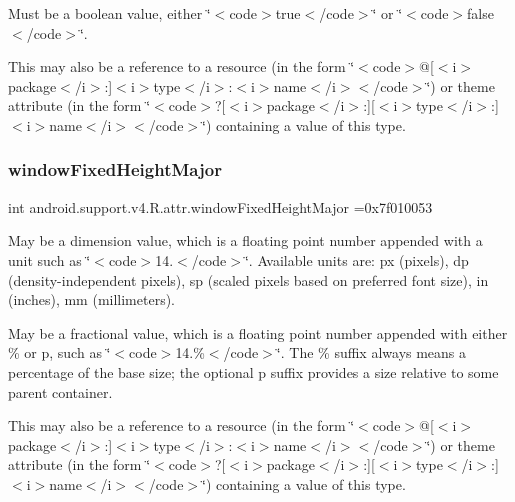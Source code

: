 Must be a boolean value, either \char`\"{}$<$code$>$true$<$/code$>$\char`\"{} or \char`\"{}$<$code$>$false$<$/code$>$\char`\"{}. 

This may also be a reference to a resource (in the form \char`\"{}$<$code$>$@\mbox{[}$<$i$>$package$<$/i$>$\+:\mbox{]}$<$i$>$type$<$/i$>$\+:$<$i$>$name$<$/i$>$$<$/code$>$\char`\"{}) or theme attribute (in the form \char`\"{}$<$code$>$?\mbox{[}$<$i$>$package$<$/i$>$\+:\mbox{]}\mbox{[}$<$i$>$type$<$/i$>$\+:\mbox{]}$<$i$>$name$<$/i$>$$<$/code$>$\char`\"{}) containing a value of this type. \mbox{\label{classandroid_1_1support_1_1v4_1_1R_1_1attr_a8a7cdfacf627f6189a625fc5a284b096}} 
\subsubsection{\texorpdfstring{window\+Fixed\+Height\+Major}{windowFixedHeightMajor}}
{\footnotesize\ttfamily int android.\+support.\+v4.\+R.\+attr.\+window\+Fixed\+Height\+Major =0x7f010053\hspace{0.3cm}{\ttfamily [static]}}

May be a dimension value, which is a floating point number appended with a unit such as \char`\"{}$<$code$>$14.\+5sp$<$/code$>$\char`\"{}. Available units are\+: px (pixels), dp (density-\/independent pixels), sp (scaled pixels based on preferred font size), in (inches), mm (millimeters). 

May be a fractional value, which is a floating point number appended with either \% or p, such as \char`\"{}$<$code$>$14.\%$<$/code$>$\char`\"{}. The \% suffix always means a percentage of the base size; the optional p suffix provides a size relative to some parent container. 

This may also be a reference to a resource (in the form \char`\"{}$<$code$>$@\mbox{[}$<$i$>$package$<$/i$>$\+:\mbox{]}$<$i$>$type$<$/i$>$\+:$<$i$>$name$<$/i$>$$<$/code$>$\char`\"{}) or theme attribute (in the form \char`\"{}$<$code$>$?\mbox{[}$<$i$>$package$<$/i$>$\+:\mbox{]}\mbox{[}$<$i$>$type$<$/i$>$\+:\mbox{]}$<$i$>$name$<$/i$>$$<$/code$>$\char`\"{}) containing a value of this type. \mbox{\label{classandroid_1_1support_1_1v4_1_1R_1_1attr_a5d8371968478fdd70167d3680af2df23}} 
